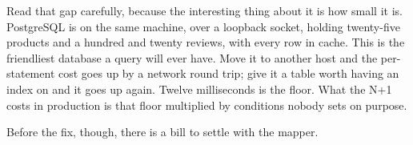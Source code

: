 Read that gap carefully, because the interesting thing about it is how small it
is. PostgreSQL is on the same machine, over a loopback socket, holding
twenty-five products and a hundred and twenty reviews, with every row in cache.
This is the friendliest database a query will ever have. Move it to another host
and the per-statement cost goes up by a network round trip; give it a table
worth having an index on and it goes up again. Twelve milliseconds is the floor.
What the N+1 costs in production is that floor multiplied by conditions nobody
sets on purpose.

Before the fix, though, there is a bill to settle with the mapper.
